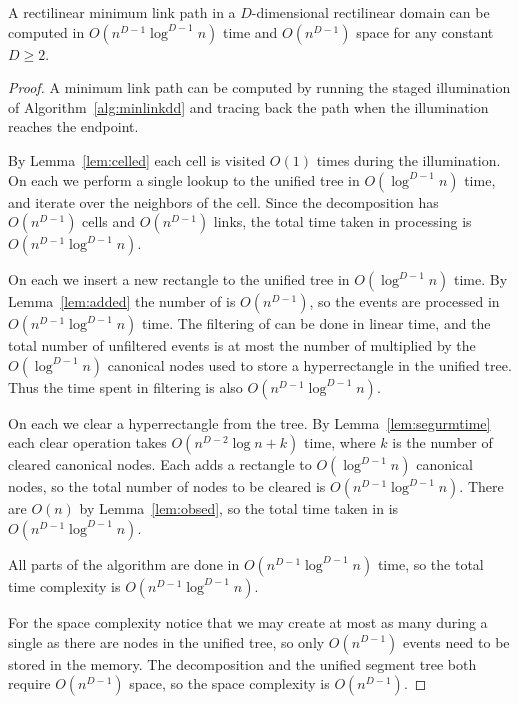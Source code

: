 \documentclass[english,gradu]{tktltiki2018}
\begin{document}
\begin{theo}A rectilinear minimum link path in a $D$-dimensional rectilinear domain can be computed in $O(n^{D-1}\log^{D-1}n)$ time and $O(n^{D-1})$ space for any constant $D\ge 2$.\end{theo}
\begin{proof}
A minimum link path can be computed by running the staged illumination of Algorithm~\ref{alg:minlinkdd} and tracing back the path when the illumination reaches the endpoint.

By Lemma~\ref{lem:celled} each cell is visited $O(1)$ times during the illumination.
On each \cellE we perform a single lookup to the unified tree in $O(\log^{D-1} n)$ time, and iterate over the neighbors of the cell.
Since the decomposition has $O(n^{D-1})$ cells and $O(n^{D-1})$ links, the total time taken in processing \cellEs is $O(n^{D-1}\log^{D-1} n)$.

On each \addE we insert a new rectangle to the unified tree in $O(\log^{D-1} n)$ time.
By Lemma~\ref{lem:added} the number of \addEs is $O(n^{D-1})$, so the events are processed in $O(n^{D-1}\log^{D-1} n)$ time.
The filtering of \addEs can be done in linear time, and the total number of unfiltered events is at most the number of \addEs multiplied by the $O(\log^{D-1} n)$ canonical nodes used to store a hyperrectangle in the unified tree.
Thus the time spent in filtering is also $O(n^{D-1}\log^{D-1} n)$.

On each \obsE we clear a hyperrectangle from the tree.
By Lemma~\ref{lem:segurmtime} each clear operation takes $O(n^{D-2}\log n + k)$ time, where $k$ is the number of cleared canonical nodes.
Each \addE adds a rectangle to $O(\log^{D-1} n)$ canonical nodes, so the total number of nodes to be cleared is $O(n^{D-1}\log^{D-1} n)$.
There are $O(n)$ \obsEs by Lemma~\ref{lem:obsed}, so the total time taken in \obsEs is $O(n^{D-1}\log^{D-1} n)$.

All parts of the algorithm are done in $O(n^{D-1}\log^{D-1} n)$ time, so the total time complexity is $O(n^{D-1}\log^{D-1} n)$.

For the space complexity notice that we may create at most as many \addEs during a single \obsE as there are nodes in the unified tree, so only $O(n^{D-1})$ events need to be stored in the memory.
The decomposition and the unified segment tree both require $O(n^{D-1})$ space, so the space complexity is $O(n^{D-1})$.
\end{proof}
\end{document}
